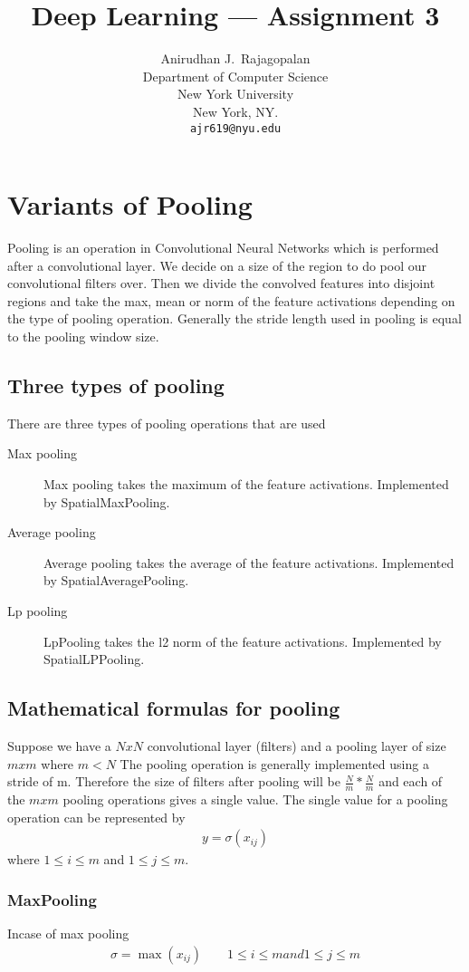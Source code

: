 \documentclass{article}
\title{Deep Learning --- Assignment 3}
\author{Anirudhan J.~Rajagopalan \\
  Department of Computer Science\\
  New York University\\
  New York, NY.\\
  \texttt{ajr619@nyu.edu} \\
}
\begin{document}
\maketitle

\section{Variants of Pooling}
Pooling is an operation in Convolutional Neural Networks which is performed after a convolutional layer.  
We decide on a size of the region to do pool our convolutional filters over.
Then we divide the convolved features into disjoint regions and take the max, mean or norm of the feature activations depending on the type of pooling operation.
Generally the stride length used in pooling is equal to the pooling window size.
\subsection{Three types of pooling}
There are three types of pooling operations that are used
\begin{description}
  \item[Max pooling] Max pooling takes the maximum of the feature activations.  Implemented by \mbox{SpatialMaxPooling}.
  \item[Average pooling] Average pooling takes the average of the feature activations. Implemented by \mbox{SpatialAveragePooling}.
  \item[Lp pooling] LpPooling takes the l2 norm of the feature activations. Implemented by \mbox{SpatialLPPooling}.
\end{description}

\subsection{Mathematical formulas for pooling}
Suppose we have a $N x N$ convolutional layer (filters) and a pooling layer of size $m x m$ where $ m < N $
The pooling operation is generally implemented using a stride of m.
Therefore the size of filters after pooling will be $\frac{N}{m} * \frac{N}{m} $ and each of the $m x m$ pooling operations gives a single value.
The single value for a pooling operation can be represented by
\begin{align*}
  y = \sigma(x_{ij})
\end{align*}
where $1 \le i \le m $ and $1 \le j \le m $.
\subsubsection{MaxPooling}
Incase of max pooling
\begin{align*}
  \sigma = \max(x_{ij}) \qquad 1 \le i \le m and 1 \le j \le m
\end{align*}
\end{document}

